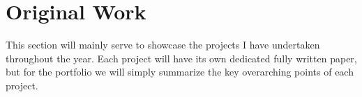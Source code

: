 \section{Original Work}

This section will mainly serve to showcase the projects I have undertaken
throughout the year. Each project will have its own dedicated fully written
paper, but for the portfolio we will simply summarize the key overarching points
of each project.



%

%

\newpage


\newpage


\newpage


